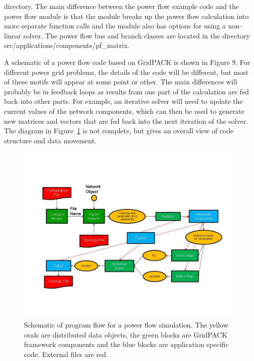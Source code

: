 \documentclass[12pt]{report} %
\begin{document}
directory. The main difference between the power flow example code and the power flow module is that the module breaks up the power flow calculation into more separate function calls and the module also has options for using a non-linear solver. The power flow bus and branch classes are located in the directory src/applications/components/pf\_matrix.

A schematic of a power flow code based on GridPACK is shown in Figure 9. For different power grid problems, the details of the code will be different, but most of these motifs will appear at some point or other. The main differences will probably be in feedback loops as results from one part of the calculation are fed back into other parts. For example, an iterative solver will need to update the current values of the network components, which can then be used to generate new matrices and vectors that are fed back into the next iteration of the solver. The diagram in Figure~\ref{fig:fig-9} is not complete, but gives an overall view of code structure and data movement.

\begin{figure}
  \centering
    \includegraphics*[width=6.50in, height=3.45in, keepaspectratio=false, trim=0.00in 0.68in 0.00in 0.75in]{Fig9}
  \caption{Schematic of program flow for a power flow simulation. The yellow ovals are distributed data objects, the green blocks are GridPACK framework components and the blue blocks are application specific code. External files are red.}
  \label{fig:fig-9}
\end{figure}


\end{document}
